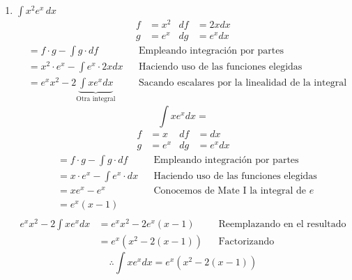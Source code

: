 \documentclass[letterpaper]{article}
\renewcommand{\*}{\cdot}
\theoremstyle{definition}
\begin{document}
\begin{enumerate}
\begin{enumerate}
	\item$\displaystyle \int x^2 e^x \, dx$
	\begin{align*}
		f &= x^2 & df &= 2x dx\\
		g &= e^x & dg &= e^xdx
	\end{align*}
	\begin{align*}
		&= f \* g - \int g\*df &&\text{Empleando integración por partes}\\
		&= x^2 \* e^x - \int e^x \* 2xdx &&\text{Haciendo uso de las funciones elegidas}\\
		&= e^x x^2 -2\underbrace{\int xe^xdx}_\text{Otra integral} &&\text{Sacando escalares por la linealidad de la integral}
	\end{align*}
	\[ \int xe^xdx = \]
	\begin{align*}
		f &= x & df &= dx\\
		g &= e^x & dg &= e^xdx
	\end{align*}
	\begin{align*}
		&= f \* g - \int g\*df &&\text{Empleando integración por partes}\\
		&= x\* e^x - \int e^x \*dx &&\text{Haciendo uso de las funciones elegidas}\\
		&= xe^x - e^x &&\text{Conocemos de Mate I la integral de }e\\
		&= e^x(x - 1)\\
	\end{align*}
	\begin{align*}
		e^x x^2 -2\int xe^xdx &= e^x x^2 -2e^x(x-1) &&\text{Reemplazando en el resultado anterior}\\
		&= e^x(x^2 -2(x-1)) &&\text{Factorizando}
	\end{align*}
	\[ \therefore \int xe^xdx = e^x(x^2 -2(x-1)) \]
	

\end{enumerate}
\end{enumerate}
\end{document}
